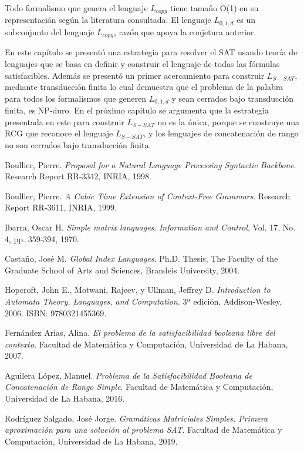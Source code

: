 \documentclass[12pt]{article}
\begin{document}
Todo formalismo que genera el lenguaje $L_{copy}$ tiene tamaño O(1) en su representación según la literatura consultada.
El lenguaje $L_{0,1,d}$ es un subconjunto del lenguaje $L_{copy}$, razón que apoya la conjetura anterior.

En este capítulo se presentó una estrategia para resolver el SAT usando teoría de lenguajes que se basa en 
definir y construir el lenguaje de todas las fórmulas satisfacibles. Además se presentó un primer acercamiento 
para construir $L_{S-SAT}$, mediante transducción finita lo cual demuestra que el problema de la palabra para 
todos los formalismos que generen $L_{0,1,d}$ y sean cerrados bajo transducción finita, es NP-duro.  En el próximo 
capítulo se argumenta que la estrategia presentada en este para construir $L_{S-SAT}$ no es la única, porque se 
construye una RCG que reconoce el lenguaje $L_{S-SAT}$, y los lenguajes de concatenación de rango no son 
cerrados bajo transducción finita.


\begin{thebibliography}{99}
    
    Boullier, Pierre.
    \textit{Proposal for a Natural Language Processing Syntactic Backbone}.
    Research Report RR-3342, INRIA, 1998.
    
    Boullier, Pierre.
    \textit{A Cubic Time Extension of Context-Free Grammars}.
    Research Report RR-3611, INRIA, 1999.
    
    Ibarra, Oscar H.
    \textit{Simple matrix languages}.
    \textit{Information and Control}, Vol. 17, No. 4, pp. 359-394, 1970.
    
    Castaño, José M.
    \textit{Global Index Languages}.
    Ph.D. Thesis, The Faculty of the Graduate School of Arts and Sciences, Brandeis University, 2004.
    
    Hopcroft, John E., Motwani, Rajeev, y Ullman, Jeffrey D.
    \textit{Introduction to Automata Theory, Languages, and Computation}.
    3ª edición, Addison-Wesley, 2006. ISBN: 9780321455369.
    
    Fernández Arias, Alina.
    \textit{El problema de la satisfacibilidad booleana libre del contexto}.
    Facultad de Matemática y Computación, Universidad de La Habana, 2007.
    
    Aguilera López, Manuel.
    \textit{Problema de la Satisfacibilidad Booleana de Concatenación de Rango Simple}.
    Facultad de Matemática y Computación, Universidad de La Habana, 2016.
    
    Rodríguez Salgado, José Jorge.
    \textit{Gramáticas Matriciales Simples. Primera aproximación para una solución al problema SAT}.
    Facultad de Matemática y Computación, Universidad de La Habana, 2019.
    
\end{thebibliography}
\end{document}
